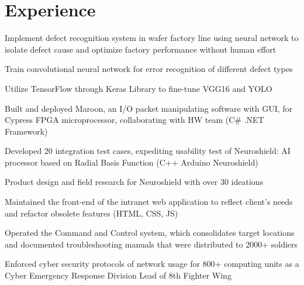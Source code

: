 \documentclass[]{deedy-resume-openfont}
\begin{document}
\begin{minipage}[t]{0.30\textwidth}
%
%

\end{minipage} 
\hfill
\begin{minipage}[t]{0.69\textwidth} %


\section{Experience}

 \descript{|}
\vspace{\topsep}
\begin{tightemize}
\item Implement defect recognition system in wafer factory line using neural network to isolate defect cause and optimize factory performance without human effort
\item Train convolutional neural network for error recognition of different defect types 
\item Utilize TensorFlow through Keras Library to fine-tune VGG16 and YOLO 
\end{tightemize}
\sectionsep

 \descript{|}
\begin{tightemize}
\item Built and deployed Maroon, an I/O packet manipulating software with GUI, for Cypress FPGA microprocessor, collaborating with HW team (C\# .NET Framework)
\item Developed 20 integration test cases, expediting usability test of Neuroshield: AI processor based on Radial Basis Function (C++ Arduino Neuroshield)
\item Product design and field research for Neuroshield with over 30 ideations 
\end{tightemize}
\sectionsep



 \descript{|}
\begin{tightemize}
\item Maintained the front-end of the intranet web application to reflect client's needs and refactor obsolete features (HTML, CSS, JS)
\item Operated the Command and Control system, which consolidates target locations and documented troubleshooting manuals that were distributed to 2000+ soldiers
\item Enforced cyber security protocols of network usage for 800+ computing units as a Cyber Emergency Response Division Lead of 8th Fighter Wing
\end{tightemize}
\sectionsep


\end{minipage}
\end{document}

